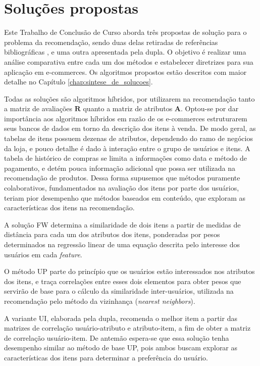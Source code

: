 
\section{Soluções propostas} %
\label{sec:solu_es_propostas}

Este Trabalho de Conclusão de Curso aborda três propostas de solução para o problema da recomendação, sendo duas delas retiradas de referências bibliográficas \cite{symeonidis2007feature,debnath2008feature}, e uma outra apresentada pela dupla. O objetivo é realizar uma análise comparativa entre cada um dos métodos e estabelecer diretrizes para sua aplicação em e-commerces. Os algoritmos propostos estão descritos com maior detalhe no Capítulo \ref{chap:sintese_de_solucoes}.

Todas as soluções são algoritmos híbridos, por utilizarem na recomendação tanto a matriz de avaliações $\mathbf{R}$ quanto a matriz de atributos $\mathbf{A}$. Optou-se por dar importância aos algoritmos híbridos em razão de os e-commerces estruturarem seus bancos de dados em torno da descrição dos itens à venda. De modo geral, as tabelas de itens possuem dezenas de atributos, dependendo do ramo de negócios da loja, e pouco detalhe é dado à interação entre o grupo de usuários e itens. A tabela de histórico de compras se limita a informações como data e método de pagamento, e detém pouca informação adicional que possa ser utilizada na recomendação de produtos. Dessa forma supusemos que métodos puramente colaborativos, fundamentados na avaliação dos itens por parte dos usuários, teriam pior desempenho que métodos baseados em conteúdo, que exploram as características dos itens na recomendação. 

A solução FW determina a similaridade de dois itens a partir de medidas de distância para cada um dos atributos dos itens, ponderadas por pesos determinados na regressão linear de uma equação descrita pelo interesse dos usuários em cada \textit{feature}.

O método UP parte do princípio que os usuários estão interessados nos atributos dos itens, e traça correlações entre esses dois elementos para obter pesos que servirão de base para o cálculo da similaridade inter-usuários, utilizada na recomendação pelo método da vizinhança (\textit{nearest neighbors}). 

A variante UI, elaborada pela dupla, recomenda o melhor item a partir das matrizes de correlação usuário-atributo e atributo-item, a fim de obter a matriz de correlação usuário-item. De antemão espera-se que essa solução tenha desempenho similar ao método de base UP, pois ambos buscam explorar as características dos itens para determinar a preferência do usuário.

